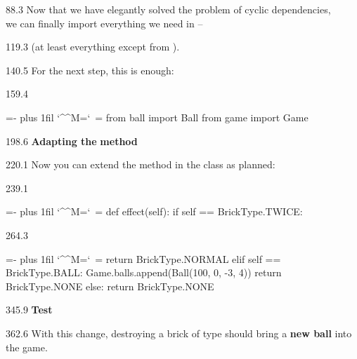 \documentclass{aslab}
\makeatletter
\newcommand*\kw[1]{\textcolor{codeorange}{#1}}
\newcommand*\fn[1]{\textcolor{codecyan}{#1}}
\newcommand*\num[1]{\textcolor{codered}{#1}}
\newcommand*\imp[1]{\textcolor{codemagenta}{#1}}
\newenvironment{pycode}{\par\ttfamily\hyphenchar\font=-1
  \lineskiplimit=-\maxdimen\lineskip=0pt\parindent=0pt
  \parfillskip=0pt plus 1fil\relax
  \catcode`\^^M=\active\catcode`\ =\active\py@setup\py@gobble}{}
\newcommand*\emo[1]{\makebox[18bp][l]{\emoji{#1}}}
\makeatother
\begin{document}
\begin{region}[pitch=13.4]{88.3}
Now that we have elegantly solved the problem of cyclic dependencies,\\
we can finally import everything we need in  --
\end{region}

\begin{region}{119.3}
(at least everything except from  ).
\end{region}

\begin{region}{140.5}
For the next step, this is enough:
\end{region}

\begin{region}[pitch=13.2]{159.4}
\begin{pycode}
\imp{from} ball \imp{import} Ball
\imp{from} game \imp{import} Game
\end{pycode}
\end{region}

\begin{region}{198.6}
\emo{1F527}\textbf{Adapting the}  \textbf{method}
\end{region}

\begin{region}{220.1}
Now you can extend the method  in the class 
as planned:
\end{region}

\begin{region}[pitch=13.2]{239.1}
\begin{pycode}
\kw{def} \fn{effect}(self):
    \kw{if} self == BrickType.TWICE:
\end{pycode}
\end{region}
\begin{region}[]{264.3}
\begin{pycode}
        \kw{return} BrickType.NORMAL
    \kw{elif} self == BrickType.BALL:
        Game.balls.append(Ball(\num{100}, \num{0}, -\num{3}, \num{4}))
        \kw{return} BrickType.NONE
    \kw{else}:
       \kw{return} BrickType.NONE
\end{pycode}
\end{region}

\begin{region}{345.9}
\emo{1F9EA}\textbf{Test}
\end{region}

\begin{region}[pitch=13.4]{362.6}
With this change, destroying a brick of type  should bring a
\textbf{new ball} into the game.
\end{region}
\end{document}
